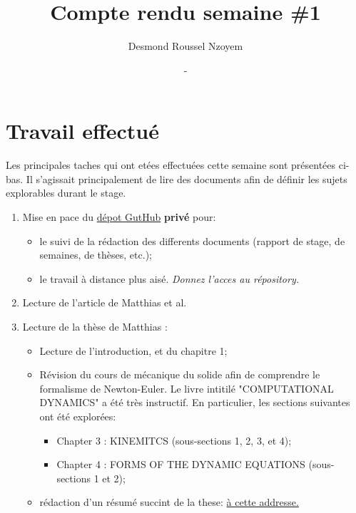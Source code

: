 \documentclass[
  french,
	11pt, %
]{fphw}
\title{Compte rendu semaine \#1} %
\author{Desmond Roussel Nzoyem} %
\date{\DTMdisplaydate{2021}{2}{3}{-1} - \DTMdisplaydate{2021}{2}{9}{-1}} %
\institute{Université de Strasbourg, Sorbone Université \\ Laboratoire Jacques-Louis Lions} %
\begin{document}
\maketitle %


\section{Travail effectué}

Les principales taches qui ont etées effectuées cette semaine sont présentées ci-bas. Il s'agissait principalement de lire des documents afin de définir les sujets explorables durant le stage.

\begin{enumerate}
  \item Mise en pace du \href{https://github.com/desmond-rn/ice-floes}{dépot GutHub} \textbf{privé} pour: 
  \begin{itemize}
    \item le suivi de la rédaction des differents documents (rapport de stage, de semaines, de thèses, etc.);
    \item le travail à distance plus aisé.
  \textit{Donnez l'acces au répository.} 
  \end{itemize}
  \item Lecture de l'article de Matthias et al. \parencite{rabatel2015dynamics}
  \item Lecture de la thèse de Matthias \parencite{rabatel2015thesis}:
  \begin{itemize}
    \item Lecture de l'introduction, et du chapitre 1;
    \item Révision du cours de mécanique du solide afin de comprendre le formalisme de Newton-Euler. Le livre intitilé "COMPUTATIONAL DYNAMICS" \parencite{shabana2009computational} a été très instructif. En particulier, les sections suivantes ont été explorées:
    \begin{itemize}
      \item Chapter 3 : KINEMITCS (sous-sections 1, 2, 3, et 4);
      \item Chapter 4 : FORMS OF THE DYNAMIC EQUATIONS (sous-sections 1 et 2);
    \end{itemize}
    \item rédaction d'un résumé succint de la these: \href{https://github.com/desmond-rn/ice-floes/blob/master/reports/matthias/main.pdf}{à cette addresse.} 
  \end{itemize}
\end{enumerate}
\end{document}
